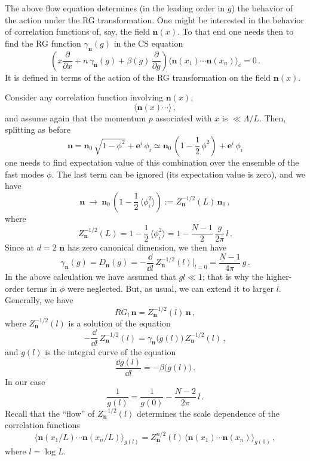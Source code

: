 The above flow equation determines (in the leading order in $g$) the behavior of
the action under the RG transformation. One might be interested in the behavior
of correlation functions of, say, the field $\mathbf n(x)$. To that end one needs
then to find the RG function $\gamma_{\mathbf n}(g)$ in the CS equation
\[
\left(x\frac\partial{\partial x}+n\,\gamma_{\mathbf n}(g)+\beta(g)\,\frac\partial{\partial g}\right)\bigl\langle\mathbf n(x_1)\cdots\mathbf n(x_n)\bigr\rangle_c=0\,.
\]
It is defined in terms of the action of the RG transformation on the field
$\mathbf n(x)$.

Consider any correlation function involving $\mathbf n(x)$,
\[
\bigl\langle\mathbf n(x)\cdots\bigr\rangle\,,
\]
and assume again that the momentum $p$ associated with $x$ is $\ll\Lambda/L$.
Then, splitting as before
\[
\mathbf n=\mathbf n_0\,\sqrt{1-\phi^2}+\mathbf e^i\,\phi_i\simeq\mathbf n_0\,\left(1-\frac12\,\phi^2\right)+\mathbf e^i\,\phi_i
\]
one needs to find expectation value of this combination over the ensemble of the
fast modes $\phi$. The last term can be ignored (its expectation value is zero),
and we have
\[
\mathbf n\ \to\ \mathbf n_0\,\left(1-\frac12\,\langle\phi_i^2\rangle\right):=Z_{\mathbf n}^{-1/2}(L)\,\mathbf n_0\,,
\]
where
\[
Z_{\mathbf n}^{-1/2}(L)=1-\frac12\,\langle\phi_i^2\rangle=1-\frac{N-1}2\,\frac g{2\pi}\,l\,.
\]
Since at $d=2$ $\mathbf n$ has zero canonical dimension, we then have
\[
\gamma_{\mathbf n}(g)=D_{\mathbf n}(g)=-\frac{\dd}{\dd l}\,Z_{\mathbf n}^{-1/2}(l)\Big|_{l=0}=\frac{N-1}{4\pi}\,g\,.
\]
In the above calculation we have assumed that $gl\ll1$; that is why the
higher-order terms in $\phi$ were neglected. But, as usual, we can extend it to
larger $l$. Generally, we have
\[
RG_l\,\mathbf n=Z_{\mathbf n}^{-1/2}(l)\,\mathbf n\,,
\]
where $Z_{\mathbf n}^{-1/2}(l)$ is a solution of the equation
\[
-\frac{\dd}{\dd l}\,Z_{\mathbf n}^{-1/2}(l)=\gamma_{\mathbf n}\bigl(g(l)\bigr)\,Z_{\mathbf n}^{-1/2}(l)\,,
\]
and $g(l)$ is the integral curve of the equation
\[
\frac{\dd g(l)}{\dd l}=-\beta\bigl(g(l)\bigr)\,.
\]
In our case
\[
\frac1{g(l)}=\frac1{g(0)}-\frac{N-2}{2\pi}\,l\,.
\]
Recall that the ``flow'' of $Z_{\mathbf n}^{-1/2}(l)$ determines the scale
dependence of the correlation functions
\[
\bigl\langle\mathbf n(x_1/L)\cdots\mathbf n(x_n/L)\bigr\rangle_{g(l)}=Z_{\mathbf n}^{n/2}(l)\,\bigl\langle\mathbf n(x_1)\cdots\mathbf n(x_n)\bigr\rangle_{g(0)}\,,
\]
where $l=\log L$.

